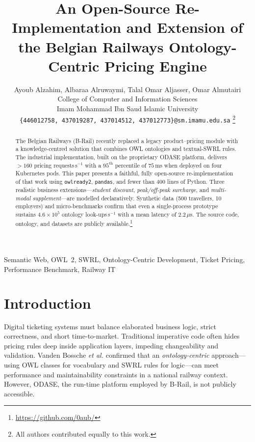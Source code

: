 \documentclass[lettersize,journal]{IEEEtran}
\begin{document}
\title{An Open-Source Re-Implementation and Extension of the Belgian Railways Ontology-Centric Pricing Engine}

\author{%
Ayoub Alzahim, Albaraa Alruwaymi, Talal Omar Aljasser, Omar Almutairi\\
College of Computer and Information Sciences\\
Imam Mohammad Ibn Saud Islamic University\\
\texttt{\{446012758, 437019287, 437014512, 437012773\}@sm.imamu.edu.sa}%
\thanks{All authors contributed equally to this work.}
}


\maketitle

\begin{abstract}
\boldmath
The Belgian Railways (B-Rail) recently replaced a legacy product–pricing module with a knowledge-centred solution that combines OWL ontologies and textual-SWRL rules.  
The industrial implementation, built on the proprietary ODAS\!E platform, delivers $>160$ pricing requests\,s$^{-1}$ with a $95^{\text{th}}$ percentile of $75$\,ms when deployed on four Kubernetes pods.  
This paper presents a faithful, fully open-source re-implementation of that work using \texttt{owlready2}, \texttt{pandas}, and fewer than 400 lines of Python.  
Three realistic business extensions—\emph{student discount}, \emph{peak/off-peak surcharge}, and \emph{multi-modal supplement}—are modelled declaratively.  
Synthetic data (500 travellers, 10 employers) and micro-benchmarks confirm that even a single-process prototype sustains \mbox{$4.6\times10^{5}$} ontology look-ups\,s$^{-1}$ with a mean latency of $2.2\,\mu$s.  
The source code, ontology, and datasets are publicly available.\footnote{\url{https://github.com/0aub/}}
\end{abstract}

\begin{IEEEkeywords}
Semantic Web, OWL~2, SWRL, Ontology-Centric Development, Ticket Pricing, Performance Benchmark, Railway IT
\end{IEEEkeywords}

\section{Introduction}
Digital ticketing systems must balance elaborated business logic, strict correctness, and short time-to-market.  
Traditional imperative code often hides pricing rules deep inside application layers, impeding changeability and validation.  
Vanden Bossche \textit{et al.} \cite{ruleml24} confirmed that an \emph{ontology-centric} approach—using OWL classes for vocabulary and SWRL rules for logic—can meet performance and maintainability constraints in a national railway context.  
However, ODAS\!E, the run-time platform employed by B-Rail, is not publicly accessible.
\end{document}
